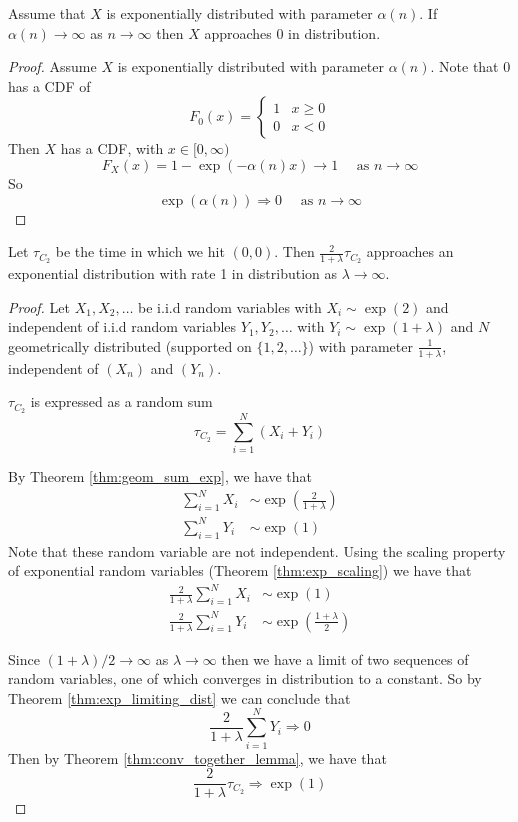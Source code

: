 \begin{theorem}\label{thm:exp_limiting_dist}
Assume that $X$ is exponentially distributed with parameter $\alpha(n)$.
If $\alpha(n) \to \infty$ as $n \to \infty$ then $X$ approaches 0 in distribution.
\end{theorem}

\begin{proof}
Assume $X$ is exponentially distributed with parameter $\alpha(n)$.
Note that 0 has a CDF of
$$
F_0(x) = \begin{cases}
    1 & x \geq 0\\
    0 & x < 0
\end{cases}
$$
Then $X$ has a CDF, with $x \in [0, \infty)$
$$
F_X(x) = 1 - \exp(-\alpha(n) x) \to 1 \quad \text{ as } n \to \infty
$$
So
$$
\exp(\alpha(n)) \Rightarrow 0 \quad \text{ as } n \to \infty
$$
\end{proof}

\begin{theorem}
Let $\tau_{C_2}$ be the time in which we hit $(0,0)$.
Then $\frac{2}{1 + \lambda} \tau_{C_2}$ approaches an exponential distribution with rate 1 in distribution as $\lambda \to \infty$.
\end{theorem}

\begin{proof}
Let $X_1, X_2, \ldots$ be i.i.d random variables with
$X_i \sim \exp(2)$ and independent of i.i.d random variables $Y_1, Y_2, \ldots$ with  $Y_i \sim \exp(1 + \lambda)$ and
$N$ geometrically distributed (supported on $\{1,2,\ldots\}$) with parameter $\frac{1}{1 + \lambda}$, independent of $(X_n)$ and $(Y_n)$.

$\tau_{C_2}$ is expressed as a random sum
$$
\tau_{C_2} = \sum_{i = 1}^N (X_i + Y_i)
$$

By Theorem \ref{thm:geom_sum_exp}, we have that
\begin{align*}
    \sum_{i = 1}^N X_i &\sim \exp\left( \frac{2}{1 + \lambda} \right)\\
    \sum_{i = 1}^N Y_i &\sim \exp( 1 )
\end{align*}
Note that these random variable are not independent.
Using the scaling property of exponential random variables (Theorem \ref{thm:exp_scaling}) we have that
\begin{align*}
    \frac{2}{1 + \lambda}\sum_{i = 1}^N X_i &\sim \exp( 1 )\\
    \frac{2}{1 + \lambda}\sum_{i = 1}^N Y_i &\sim \exp \left( \frac{1 + \lambda}{2} \right)
\end{align*}

Since $(1 + \lambda)/2 \to \infty$ as $\lambda \to \infty$ then we have a limit of two sequences of random variables, one of which converges in distribution to a constant. So by Theorem \ref{thm:exp_limiting_dist} we can conclude that
$$
\frac{2}{1 + \lambda}\sum_{i = 1}^N Y_i \Rightarrow 0
$$
Then by Theorem \ref{thm:conv_together_lemma}, we have that
$$
\frac{2}{1 + \lambda} \tau_{C_2} \Rightarrow \exp(1)
$$
\end{proof}

